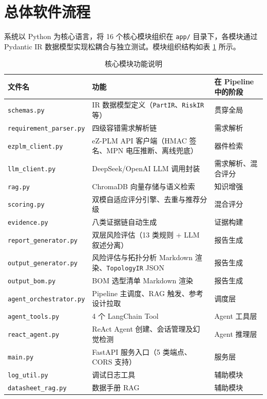 
\section{总体软件流程}

系统以 Python 为核心语言，将 16 个核心模块组织在 \texttt{app/} 目录下，各模块通过 Pydantic IR 数据模型实现松耦合与独立测试。模块组织结构如表 \ref{tab:modules} 所示。

\begin{table}[h]
\centering
\caption{核心模块功能说明}
\label{tab:modules}
\footnotesize
\setlength{\tabcolsep}{6pt} %
\renewcommand{\arraystretch}{1.1} %
\begin{tabularx}{\textwidth}{p{4cm}Xp{3.5cm}}
\toprule
\textbf{文件名} & \textbf{功能} & \textbf{在 Pipeline 中的阶段} \\
\midrule
\texttt{schemas.py} & IR 数据模型定义（\texttt{PartIR}、\texttt{RiskIR} 等） & 贯穿全局 \\
\texttt{requirement\_parser.py} & 四级容错需求解析链 & 需求解析 \\
\texttt{ezplm\_client.py} & eZ-PLM API 客户端（HMAC 签名、MPN 电压推断、离线兜底） & 器件检索 \\
\texttt{llm\_client.py} & DeepSeek/OpenAI LLM 调用封装 & 需求解析、混合评分 \\
\texttt{rag.py} & ChromaDB 向量存储与语义检索 & 知识增强 \\
\texttt{scoring.py} & 双模自适应评分引擎、去重与推荐分级 & 混合评分 \\
\texttt{evidence.py} & 八类证据链自动生成 & 证据构建 \\
\texttt{report\_generator.py} & 双层风险评估（13 类规则 + LLM 叙述分离） & 报告生成 \\
\texttt{output\_generator.py} & 风险评估与拓扑分析 Markdown 渲染、\texttt{TopologyIR} JSON & 报告生成 \\
\texttt{output\_bom.py} & BOM 选型清单 Markdown 渲染 & 报告生成 \\
\texttt{agent\_orchestrator.py} & Pipeline 主调度、RAG 触发、参考设计拉取 & 调度层 \\
\texttt{agent\_tools.py} & 4 个 LangChain Tool & Agent 工具层 \\
\texttt{react\_agent.py} & ReAct Agent 创建、会话管理及幻觉检测 & Agent 推理层 \\
\texttt{main.py} & FastAPI 服务入口（5 类端点、CORS 支持） & 服务层 \\
\texttt{log\_util.py} & 调试日志工具 & 辅助模块 \\
\texttt{datasheet\_rag.py} & 数据手册 RAG & 辅助模块 \\
\bottomrule
\end{tabularx}
\end{table}


